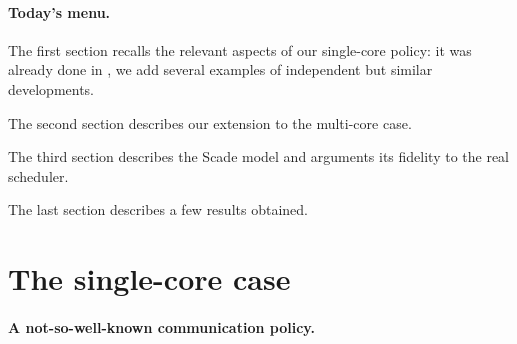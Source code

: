 \documentclass[a4paper]{article}
\begin{document}
\paragraph*{Today's menu.}

The first section recalls the relevant aspects of our single-core policy: it was already done in \cite{destelle:hal-02267646},
we add several examples of independent but similar developments.

The second section describes our extension to the multi-core case.

The third section describes the Scade model and arguments its fidelity to the real scheduler.

The last section describes a few results obtained.


\section{The single-core case} \label{section:single-core}

\paragraph*{A not-so-well-known communication policy.}
\end{document}
